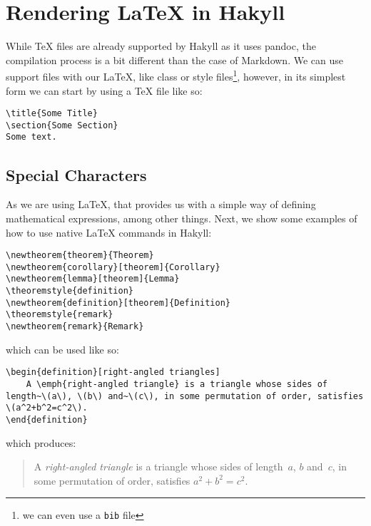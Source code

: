 \section{Rendering LaTeX in Hakyll}
While TeX files are already supported by Hakyll as it uses pandoc, the compilation process is a bit different than the case of Markdown.
We can use support files with our LaTeX, like class or style files\footnote{we can even use a \texttt{bib} file}, however, in its simplest form we can start by using a TeX file like so:
\begin{verbatim}
\title{Some Title}
\section{Some Section}
Some text.
\end{verbatim}

\subsection{Special Characters}
As we are using LaTeX, that provides us with a simple way of defining mathematical expressions, among other things.
Next, we show some examples of how to use native LaTeX commands in Hakyll:
\begin{verbatim}
\newtheorem{theorem}{Theorem}
\newtheorem{corollary}[theorem]{Corollary}
\newtheorem{lemma}[theorem]{Lemma}
\theoremstyle{definition}
\newtheorem{definition}[theorem]{Definition}
\theoremstyle{remark}
\newtheorem{remark}{Remark}
\end{verbatim}
which can be used like so:
\begin{verbatim}
\begin{definition}[right-angled triangles]
    A \emph{right-angled triangle} is a triangle whose sides of length~\(a\), \(b\) and~\(c\), in some permutation of order, satisfies \(a^2+b^2=c^2\).
\end{definition}
\end{verbatim}
which produces:
\begin{quote}
\begin{definition}
    A \emph{right-angled triangle} is a triangle whose sides of length~\(a\), \(b\) and~\(c\), in some permutation of order, satisfies \(a^2+b^2=c^2\).
\end{definition}
\end{quote}

